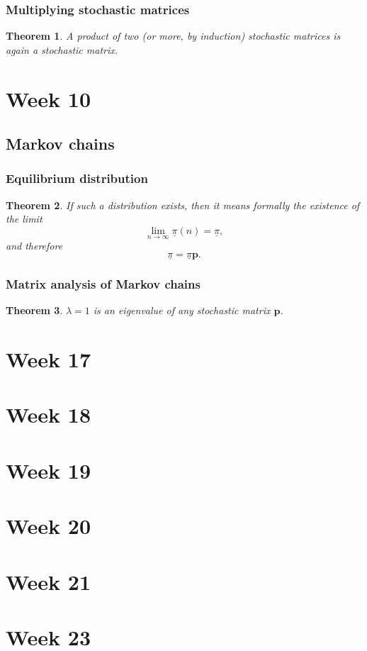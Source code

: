 \documentclass{article}
\newtheorem{theorem}{Theorem}
\begin{document}
\subsubsection{Multiplying stochastic matrices}
\begin{theorem}
    A product of two (or more, by induction) stochastic matrices is again a stochastic matrix.
\end{theorem}

\section{Week 10}
\subsection{Markov chains}
\subsubsection{Equilibrium distribution}
\begin{theorem}
    If such a distribution exists, then it means formally the existence of the limit
    \begin{equation}
        \lim_{n\to\infty}\underline{\pi}(n)=\underline{\pi},
    \end{equation}
    and therefore
    \begin{equation}
        \underline{\pi} = \underline{\pi}\mathbf{p}.
    \end{equation}
\end{theorem}
\subsubsection{Matrix analysis of Markov chains}
\begin{theorem}
    $\lambda=1$ is an eigenvalue of any stochastic matrix $\mathbf{p}$.
\end{theorem}

\section{Week 17}

\section{Week 18}

\section{Week 19}

\section{Week 20}

\section{Week 21}

\section{Week 23}
\end{document}
